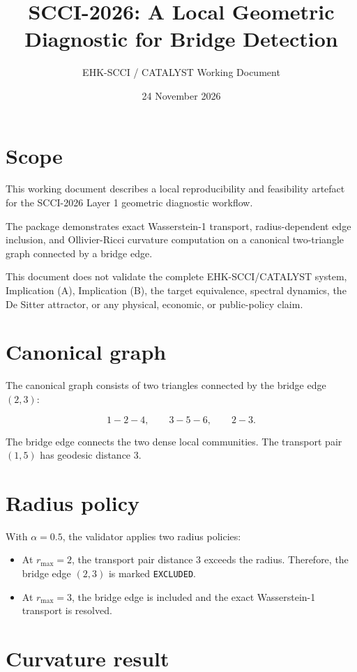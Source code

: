 \documentclass[11pt]{article}
\title{SCCI-2026: A Local Geometric Diagnostic for Bridge Detection}
\author{EHK-SCCI / CATALYST Working Document}
\date{24 November 2026}
\begin{document}
\maketitle

\section{Scope}

This working document describes a local reproducibility and feasibility
artefact for the SCCI-2026 Layer 1 geometric diagnostic workflow.

The package demonstrates exact Wasserstein-1 transport, radius-dependent
edge inclusion, and Ollivier-Ricci curvature computation on a canonical
two-triangle graph connected by a bridge edge.

This document does not validate the complete EHK-SCCI/CATALYST system,
Implication (A), Implication (B), the target equivalence, spectral dynamics,
the De Sitter attractor, or any physical, economic, or public-policy claim.

\section{Canonical graph}

The canonical graph consists of two triangles connected by the bridge edge
$(2,3)$:

\[
1-2-4, \qquad 3-5-6, \qquad 2-3.
\]

The bridge edge connects the two dense local communities. The transport pair
$(1,5)$ has geodesic distance $3$.

\section{Radius policy}

With $\alpha=0.5$, the validator applies two radius policies:

\begin{itemize}
  \item At $r_{\max}=2$, the transport pair distance $3$ exceeds the radius.
  Therefore, the bridge edge $(2,3)$ is marked \texttt{EXCLUDED}.
  \item At $r_{\max}=3$, the bridge edge is included and the exact
  Wasserstein-1 transport is resolved.
\end{itemize}

\section{Curvature result}
\end{document}
